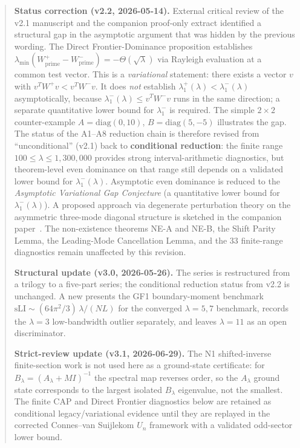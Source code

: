 \documentclass[12pt,a4paper]{article}
\theoremstyle{definition}
\theoremstyle{remark}
\begin{document}
\begin{abstract}
\medskip\noindent
\textbf{Status correction (v2.2, 2026-05-14).}
External critical review of the v2.1 manuscript and the companion proof-only extract \cite{Geiger2026evendom} identified a structural gap in the asymptotic argument that was hidden by the previous wording. The Direct Frontier-Dominance proposition establishes
$\lambda_{\min}(W^+_{\mathrm{prime}}-W^-_{\mathrm{prime}})=-\Theta(\sqrt\lambda)$
via Rayleigh evaluation at a common test vector. This is a \emph{variational} statement: there exists a vector $v$ with $v^T W^+ v < v^T W^- v$. It does \emph{not} establish $\lambda_1^+(\lambda)<\lambda_1^-(\lambda)$ asymptotically, because $\lambda_1^-(\lambda)\le v^T W^- v$ runs in the same direction; a separate quantitative lower bound for $\lambda_1^-$ is required. The simple $2\times 2$ counter-example $A=\mathrm{diag}(0,10)$, $B=\mathrm{diag}(5,-5)$ illustrates the gap.
The status of the A1--A8 reduction chain is therefore revised from ``unconditional'' (v2.1) back to \textbf{conditional reduction}: the finite range $100\le\lambda\le 1{,}300{,}000$ provides strong interval-arithmetic diagnostics, but theorem-level even dominance on that range still depends on a validated lower bound for $\lambda_1^-(\lambda)$. Asymptotic even dominance is reduced to the \emph{Asymptotic Variational Gap Conjecture} (a quantitative lower bound for $\lambda_1^-(\lambda)$). A proposed approach via degenerate perturbation theory on the asymmetric three-mode diagonal structure is sketched in the companion paper~\cite{Geiger2026evendom}. The non-existence theorems NE-A and NE-B, the Shift Parity Lemma, the Leading-Mode Cancellation Lemma, and the 33 finite-range diagnostics remain unaffected by this revision.

\medskip\noindent
\textbf{Structural update (v3.0, 2026-05-26).}
The series is restructured from a trilogy to a five-part series; the conditional
reduction status from v2.2 is unchanged. A new  presents the
GF1 boundary-moment benchmark
$\mathrm{sLI} \sim (64\pi^2/3)\,\lambda/(NL)$ for the converged
$\lambda=5,7$ benchmark, records the $\lambda=3$ low-bandwidth
outlier separately, and leaves $\lambda=11$ as an open discriminator.

\medskip\noindent
\textbf{Strict-review update (v3.1, 2026-06-29).}
The N1 shifted-inverse finite-section work is not used here as a ground-state
certificate: for $B_\lambda=(A_\lambda+MI)^{-1}$ the spectral map reverses
order, so the $A_\lambda$ ground state corresponds to the largest isolated
$B_\lambda$ eigenvalue, not the smallest. The finite CAP and Direct Frontier
diagnostics below are retained as conditional legacy/variational evidence until
they are replayed in the corrected Connes--van Suijlekom $U_n$ framework with a
validated odd-sector lower bound.
\end{abstract}
\end{document}
